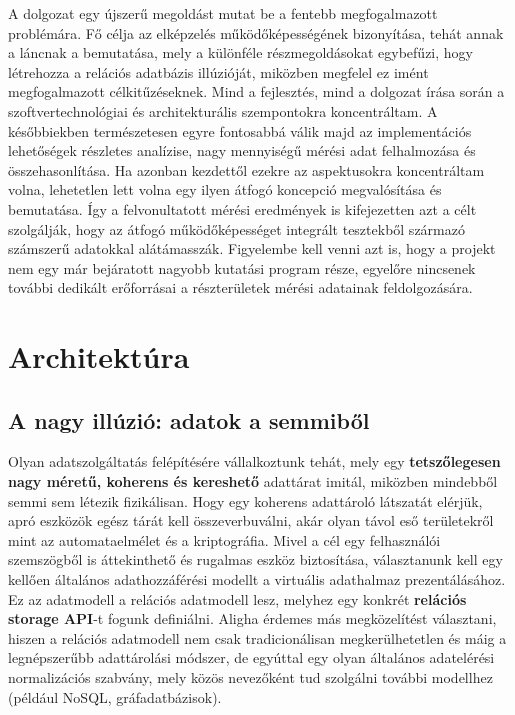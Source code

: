 \documentclass[
    parspace,
    noindent,
    nohyp,
]{elteiktdk}[2023/04/10]
\newcommand{\todoref}[1]{\todo[inline, noinlinepar, color=red, textcolor=white, inlinewidth=0.6cm, caption={#1}]{\large \textbf{×}}}
\begin{document}
A dolgozat egy újszerű megoldást mutat be a fentebb megfogalmazott problémára.
Fő célja az elképzelés működőképességének bizonyítása,
tehát annak a láncnak a bemutatása,
mely a különféle részmegoldásokat egybefűzi,
hogy létrehozza a relációs adatbázis illúzióját,
miközben megfelel ez imént megfogalmazott célkitűzéseknek.
Mind a fejlesztés, mind a dolgozat írása során
a szoftvertechnológiai és architekturális szempontokra koncentráltam.
A későbbiekben természetesen egyre fontosabbá válik majd az implementációs lehetőségek
részletes analízise, nagy mennyiségű mérési adat felhalmozása és összehasonlítása.
Ha azonban kezdettől ezekre az aspektusokra koncentráltam volna,
lehetetlen lett volna egy ilyen átfogó koncepció megvalósítása és bemutatása.
Így a felvonultatott mérési eredmények is kifejezetten azt a célt szolgálják,
hogy az átfogó működőképességet integrált tesztekből származó számszerű adatokkal alátámasszák.
Figyelembe kell venni azt is,
hogy a projekt nem egy már bejáratott nagyobb kutatási program része,
egyelőre nincsenek további dedikált erőforrásai
a részterületek mérési adatainak feldolgozására.
\todoref{+CITE: a dolgozat koncepciója: a mérések fényében ezen enyhíteni}


\chapter{Architektúra}

\section{A nagy illúzió: adatok a semmiből}

Olyan adatszolgáltatás felépítésére vállalkoztunk tehát,
mely egy \textbf{tetszőlegesen nagy méretű, koherens és kereshető} adattárat imitál,
miközben mindebből semmi sem létezik fizikálisan.
Hogy egy koherens adattároló látszatát elérjük,
apró eszközök egész tárát kell összeverbuválni,
akár olyan távol eső területekről mint az automataelmélet és a kriptográfia.
Mivel a cél egy felhasználói szemszögből is áttekinthető és rugalmas eszköz biztosítása,
választanunk kell egy kellően általános adathozzáférési modellt a virtuális adathalmaz prezentálásához.
Ez az adatmodell a relációs adatmodell lesz,
melyhez egy konkrét \textbf{relációs storage API}-t fogunk definiálni.
Aligha érdemes más megközelítést választani,
hiszen a relációs adatmodell nem csak tradicionálisan megkerülhetetlen
és máig a legnépszerűbb adattárolási módszer,
de egyúttal egy olyan általános adatelérési normalizációs szabvány,
mely közös nevezőként tud szolgálni további modellhez (például NoSQL, gráfadatbázisok).
\end{document}
